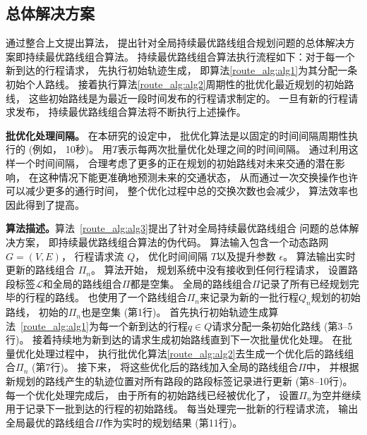 	\subsection{总体解决方案}
	通过整合上文提出算法， 提出针对全局持续最优路线组合规划问题的总体解决方案即持续最优路线组合算法。 持续最优路线组合算法执行流程如下：对于每一个新到达的行程请求， 先执行初始轨迹生成， 即算法\ref{route_alg:alg1}为其分配一条初始个人路线。 接着执行算法\ref{route_alg:alg2}周期性的批优化最近规划的初始路线， 这些初始路线是为最近一段时间发布的行程请求制定的。 一旦有新的行程请求发布， 持续最优路线组合算法将不断执行上述操作。

	\textbf{批优化处理间隔。}
	在本研究的设定中， 批优化算法是以固定的时间间隔周期性执行的 (例如， 10秒)。 用$T$表示每两次批量优化处理之间的时间间隔。 通过利用这样一个时间间隔， 合理考虑了更多的正在规划的初始路线对未来交通的潜在影响， 在这种情况下能更准确地预测未来的交通状态， 从而通过一次交换操作也许可以减少更多的通行时间， 整个优化过程中总的交换次数也会减少， 算法效率也因此得到了提高。

	\textbf{算法描述。}算法~\ref{route_alg:alg3}提出了针对全局持续最优路线组合 问题的总体解决方案， 即持续最优路线组合算法的伪代码。 算法输入包含一个动态路网$G=(V,E)$， 行程请求流 $Q$， 优化时间间隔 $T$以及提升参数 $\epsilon$。 算法输出实时更新的路线组合 $\Pi_n$。
	算法开始， 规划系统中没有接收到任何行程请求， 设置路段标签$\mathcal{L}$和全局的路线组合$\Pi$都是空集。 全局的路线组合$\Pi$记录了所有已经规划完毕的行程的路线。 也使用了一个路线组合$\Pi_n$来记录为新的一批行程$Q_n$规划的初始路线， 初始的$\Pi_n$也是空集 (第1行)。 首先执行初始轨迹生成算法~\ref{route_alg:alg1}为每一个新到达的行程$q \in Q$请求分配一条初始化路线 (第3--5行)。 接着持续地为新到达的请求生成初始路线直到下一次批量优化处理。 在批量优化处理过程中， 执行批优化算法\ref{route_alg:alg2}去生成一个优化后的路线组合$\Pi_n$ (第7行)。 接下来， 将这些优化后的路线加入全局的路线组合$\Pi$中， 并根据新规划的路线产生的轨迹位置对所有路段的路段标签记录进行更新 (第8--10行)。
	   每一个优化处理完成后， 由于所有的初始路线已经被优化了， 设置$\Pi_n$为空并继续用于记录下一批到达的行程的初始路线。 每当处理完一批新的行程请求流， 输出全局最优的路线组合$\Pi$作为实时的规划结果 (第11行)。

